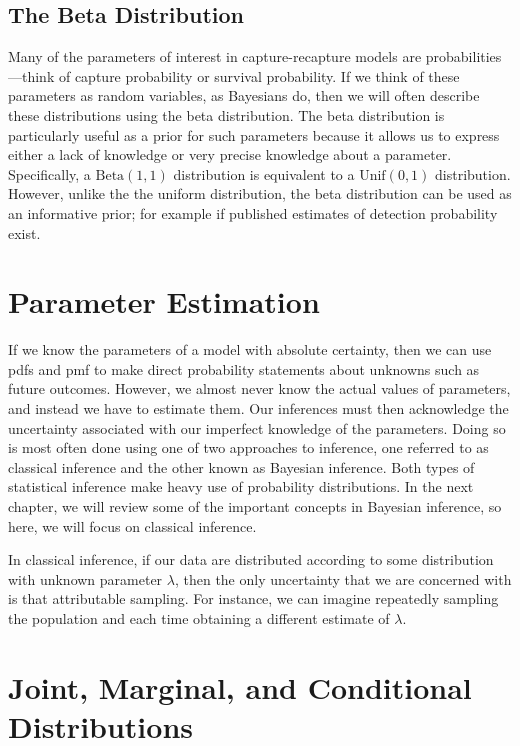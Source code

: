 \subsection{The Beta Distribution}

Many of the parameters of interest in capture-recapture models are
probabilities---think of capture probability or survival
probability. If we think of these parameters as random variables,
as Bayesians do, then we will often describe these distributions using
the beta distribution. The beta distribution is particularly useful as
a prior for such parameters because it allows us to express either a
lack of knowledge or very precise knowledge about a
parameter. Specifically, a $\text{Beta}(1,1)$ distribution is
equivalent to a $\text{Unif}(0, 1)$ distribution. However, unlike the
the uniform distribution, the beta distribution can be used as an
informative prior; for example if published estimates of detection
probability exist.








\section{Parameter Estimation}

If we know the parameters of a model with absolute certainty, then
we can use pdfs and pmf to make direct
probability statements about unknowns such as future outcomes. However, we
almost never know the actual values of parameters, and instead we have
to estimate them. Our inferences must then acknowledge the uncertainty
associated with our imperfect knowledge of the parameters. Doing so is
most often done using one of two approaches to inference, one referred
to as classical inference and the other known as Bayesian
inference. Both types of statistical inference make heavy use of
probability distributions. In the next chapter, we will review some of
the important concepts in Bayesian inference, so here, we will
focus on classical inference.

In classical inference, if our data are distributed according to some
distribution with unknown parameter $\lambda$, then the only
uncertainty that we are concerned with is that attributable
sampling. For instance, we can imagine repeatedly sampling the
population and each time obtaining a different estimate of $\lambda$.




\section{Joint, Marginal, and Conditional Distributions}

